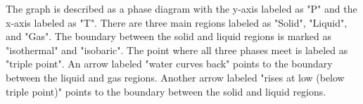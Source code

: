 The graph is described as a phase diagram with the y-axis labeled as "P" and the x-axis labeled as "T". There are three main regions labeled as "Solid", "Liquid", and "Gas". The boundary between the solid and liquid regions is marked as "isothermal" and "isobaric". The point where all three phases meet is labeled as "triple point". An arrow labeled "water curves back" points to the boundary between the liquid and gas regions. Another arrow labeled "rises at low (below triple point)" points to the boundary between the solid and liquid regions.
